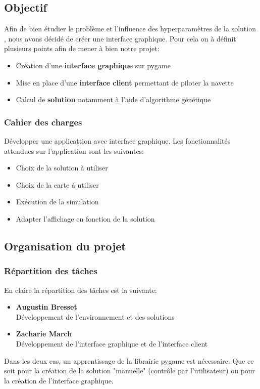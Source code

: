 \documentclass[french,a4paper,10pt,twocolumn]{article}
\begin{document}
\subsection{Objectif}

Afin de bien étudier le problème et l'influence des hyperparamètres de la solution , nous avons décidé de créer une interface graphique.
Pour cela on à définit plusieurs points afin de mener à bien notre projet: 
\begin{itemize}
    \item Création d'une \textbf{interface graphique} sur pygame
    \item Mise en place d'une \textbf{interface client} permettant de piloter la navette
    \item Calcul de \textbf{solution} notamment à l'aide d'algorithme génétique    
\end{itemize}

\subsubsection{Cahier des charges}

Développer une applicattion avec interface graphique. Les fonctionnalités attendues sur l'application sont les suivantes:
\begin{itemize}
    \item Choix de la solution à utiliser
    \item Choix de la carte à utiliser
    \item Exécution de la simulation
    \item Adapter l'affichage en fonction de la solution
\end{itemize}

\subsection{Organisation du projet}

\subsubsection{Répartition des tâches}

En claire la répartition des tâches est la suivante:
\begin{itemize}
    \item \textbf{Augustin Bresset}\\
        Développement de l'environnement et des solutions 
    \item \textbf{Zacharie March}\\
        Développement de l'interface graphique et de l'interface client
\end{itemize}
Dans les deux cas, un apprentissage de la librairie pygame est nécessaire. Que ce soit pour la création de la solution "manuelle" (contrôle par l'utilisateur)
ou pour la création de l'interface graphique.
\end{document}
